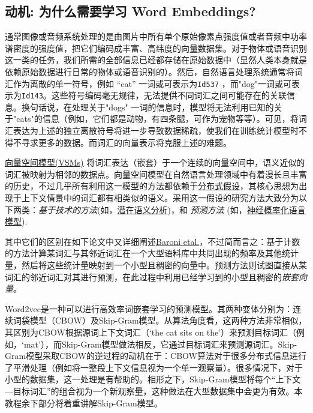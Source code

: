 \subsection{动机: 为什么需要学习 Word Embeddings?}\label{ux52a8}

通常图像或音频系统处理的是由图片中所有单个原始像素点强度值或者音频中功率谱密度的强度值，把它们编码成丰富、高纬度的向量数据集。对于物体或语音识别这一类的任务，我们所需的全部信息已经都存储在原始数据中（显然人类本身就是依赖原始数据进行日常的物体或语音识别的）。然后，自然语言处理系统通常将词汇作为离散的单一符号，例如
``cat'' 一词或可表示为\lstinline{Id537} ，而"dog"一词或可表示为\lstinline{Id143}。这些符号编码毫无规律，无法提供不同词汇之间可能存在的关联信息。换句话说，在处理关于"dogs" 一词的信息时，模型将无法利用已知的关于"cats"的信息（例如，它们都是动物，有四条腿，可作为宠物等等）。可见，将词汇表达为上述的独立离散符号将进一步导致数据稀疏，使我们在训练统计模型时不得不寻求更多的数据。而词汇的向量表示将克服上述的难题。

\href{https://en.wikipedia.org/wiki/Vector_space_model}{向量空间模型(VSMs)}
将词汇表达（嵌套）于一个连续的向量空间中，语义近似的词汇被映射为相邻的数据点。向量空间模型在自然语言处理领域中有着漫长且丰富的历史，不过几乎所有利用这一模型的方法都依赖于\href{https://en.wikipedia.org/wiki/Distributional_semantics\#Distributional_Hypothesis}{分布式假设}，其核心思想为出现于上下文情景中的词汇都有相类似的语义。采用这一假设的研究方法大致分为以下两类：\emph{基于技术的方法}(如，\href{https://en.wikipedia.org/wiki/Latent_semantic_analysis}{潜在语义分析})，和 \emph{预测方法} (如，\href{http://www.scholarpedia.org/article/Neural_net_language_models}{神经概率化语言模型}).

其中它们的区别在如下论文中又详细阐述\href{http://clic.cimec.unitn.it/marco/publications/acl2014/baroni-etal-countpredict-acl2014.pdf}{Baroni
etal.}，不过简而言之：基于计数的方法计算某词汇与其邻近词汇在一个大型语料库中共同出现的频率及其他统计量，然后将这些统计量映射到一个小型且稠密的向量中。预测方法则试图直接从某词汇的邻近词汇对其进行预测，在此过程中利用已经学习到的小型且稠密的\emph{嵌套向量}。

Word2vec是一种可以进行高效率词嵌套学习的预测模型。其两种变体分别为：连续词袋模型（CBOW）及Skip-Gram模型。从算法角度看，这两种方法非常相似，其区别为CBOW根据源词上下文词汇（`the cat sits on the'）来预测目标词汇（例如，`mat'），而Skip-Gram模型做法相反，它通过目标词汇来预测源词汇。Skip-Gram模型采取CBOW的逆过程的动机在于：CBOW算法对于很多分布式信息进行了平滑处理（例如将一整段上下文信息视为一个单一观察量）。很多情况下，对于小型的数据集，这一处理是有帮助的。相形之下，Skip-Gram模型将每个“上下文---目标词汇”的组合视为一个新观察量，这种做法在大型数据集中会更为有效。本教程余下部分将着重讲解Skip-Gram模型。

